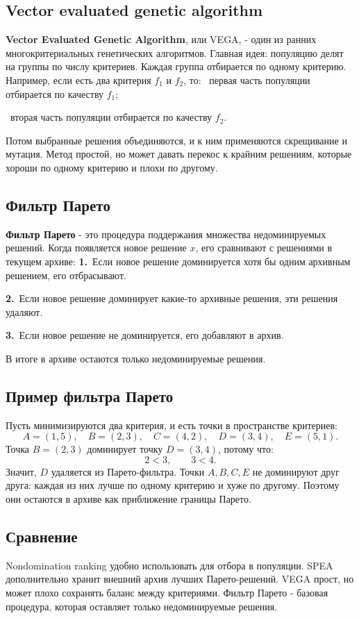 \documentclass[12pt,a4paper]{article}
\begin{document}
\subsection{Vector evaluated genetic algorithm}
\textbf{Vector Evaluated Genetic Algorithm}, или VEGA, - один из ранних многокритериальных генетических алгоритмов.
Главная идея: популяцию делят на группы по числу критериев. Каждая группа отбирается по одному критерию.
Например, если есть два критерия $f_1$ и $f_2$, то:
\noindent\textbullet\ первая часть популяции отбирается по качеству $f_1$;\par
\noindent\textbullet\ вторая часть популяции отбирается по качеству $f_2$.\par
Потом выбранные решения объединяются, и к ним применяются скрещивание и мутация.
Метод простой, но может давать перекос к крайним решениям, которые хороши по одному критерию и плохи по другому.
\subsection{Фильтр Парето}
\textbf{Фильтр Парето} - это процедура поддержания множества недоминируемых решений.
Когда появляется новое решение $x$, его сравнивают с решениями в текущем архиве:
\noindent\textbf{1.}\ Если новое решение доминируется хотя бы одним архивным решением, его отбрасывают.\par
\noindent\textbf{2.}\ Если новое решение доминирует какие-то архивные решения, эти решения удаляют.\par
\noindent\textbf{3.}\ Если новое решение не доминируется, его добавляют в архив.\par
В итоге в архиве остаются только недоминируемые решения.
\subsection{Пример фильтра Парето}
Пусть минимизируются два критерия, и есть точки в пространстве критериев:
\[
A=(1,5),\quad B=(2,3),\quad C=(4,2),\quad D=(3,4),\quad E=(5,1).
\]
Точка $B=(2,3)$ доминирует точку $D=(3,4)$, потому что:
\[
2<3,\qquad 3<4.
\]
Значит, $D$ удаляется из Парето-фильтра.
Точки $A,B,C,E$ не доминируют друг друга: каждая из них лучше по одному критерию и хуже по другому. Поэтому они остаются в архиве как приближение границы Парето.
\subsection{Сравнение}
Nondomination ranking удобно использовать для отбора в популяции.
SPEA дополнительно хранит внешний архив лучших Парето-решений.
VEGA прост, но может плохо сохранять баланс между критериями.
Фильтр Парето - базовая процедура, которая оставляет только недоминируемые решения.
\end{document}
